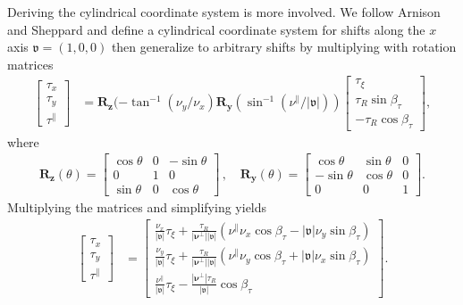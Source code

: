 \documentclass[]{osa-article}
\providecommand{\mb}[1]{\mathbf{#1}}
\newcommand{\mypar}{\parallel}
\providecommand{\bs}[1]{\boldsymbol{#1}}
\providecommand{\bv}{\boldsymbol{\mathfrak{v}}}
\providecommand{\bvperp}{\bs{\nu}^{\bot}}
\providecommand{\bvpar}{\nu^{\parallel}}
\providecommand{\btpar}{\tau^{\mypar}}
\begin{document}
Deriving the cylindrical coordinate system is more involved. We follow Arnison and Sheppard \cite{arnison2002} and define a cylindrical coordinate system for shifts along the $x$ axis $\bv = (1,0,0)$ then generalize to arbitrary shifts by multiplying with rotation matrices
\begin{align}
  \begin{bmatrix}
    \tau_x\\
    \tau_y\\
    \btpar
  \end{bmatrix}
&= \mb{R}_{\mb{z}}(-\tan^{-1}(\nu_y/\nu_x)\mb{R}_{\mb{y}}(\sin^{-1}(\bvpar/|\bv|))\begin{bmatrix}
    \tau_\xi\\
    \tau_R\sin\beta_\tau\\
    -\tau_R\cos\beta_\tau
  \end{bmatrix},
\end{align}
where
\begin{align}
  \mb{R}_\mb{z}(\theta) =
  \begin{bmatrix}
    \cos\theta & 0 & -\sin\theta\\
    0 & 1 & 0\\
    \sin\theta & 0 &\cos\theta
  \end{bmatrix}\, ,\quad 
  \mb{R}_\mb{y}(\theta) =
  \begin{bmatrix}
    \cos\theta & \sin\theta & 0\\
    -\sin\theta & \cos\theta & 0\\
    0 & 0 & 1
  \end{bmatrix}  .
\end{align}
Multiplying the matrices and simplifying yields
\begin{align}
    \begin{bmatrix}
    \tau_x\\
    \tau_y\\
    \btpar
  \end{bmatrix}
  &=
  \begin{bmatrix}
    \displaystyle\frac{\nu_x}{|\bv|}\tau_\xi + \frac{\tau_R}{|\bvperp||\bv|}(\bvpar\nu_x\cos\beta_\tau - |\bv|\nu_y\sin\beta_\tau)\\[1em]
    \displaystyle\frac{\nu_y}{|\bv|}\tau_\xi + \frac{\tau_R}{|\bvperp||\bv|}(\bvpar\nu_y\cos\beta_\tau + |\bv|\nu_x\sin\beta_\tau)\\[1em]
    \displaystyle\frac{\bvpar}{|\bv|}\tau_\xi - \frac{|\bvperp|\tau_R}{|\bv|}\cos\beta_\tau
  \end{bmatrix}.\label{eq:cylindrical}
\end{align}
\end{document}
